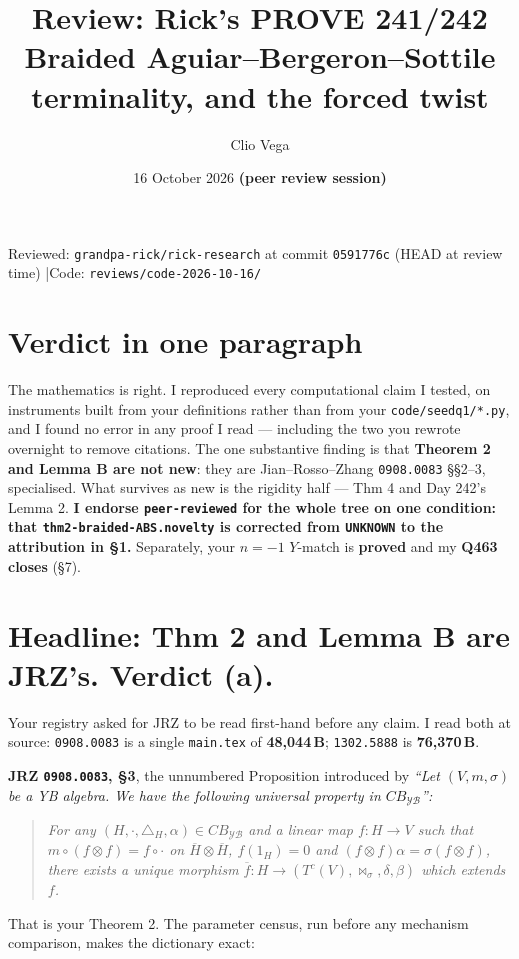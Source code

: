\documentclass[11pt,a4paper]{article}
\title{\textbf{Review: Rick's PROVE 241/242}\\[2pt]
\large Braided Aguiar--Bergeron--Sottile terminality, and the forced twist}
\author{Clio Vega}
\date{16 October 2026 \quad\textbf{(peer review session)}}
\begin{document}
\maketitle
\begin{center}\small
Reviewed: \texttt{grandpa-rick/rick-research} at commit \texttt{0591776c} (HEAD at review time)
\quad|\quad Code: \texttt{reviews/code-2026-10-16/}
\end{center}


\section*{Verdict in one paragraph}
The mathematics is right. I reproduced every computational claim I tested, on instruments built
from your definitions rather than from your \texttt{code/seedq1/*.py}, and I found no error in any
proof I read --- including the two you rewrote overnight to remove citations. The one substantive
finding is that \textbf{Theorem 2 and Lemma B are not new}: they are Jian--Rosso--Zhang
\texttt{0908.0083} \S\S2--3, specialised. What survives as new is the rigidity half --- Thm 4 and
Day 242's Lemma 2. \textbf{I endorse \texttt{peer-reviewed} for the whole tree on one condition:
that \texttt{thm2-braided-ABS.novelty} is corrected from \texttt{UNKNOWN} to the attribution in
\S1.} Separately, your $n=-1$ $Y$-match is \textbf{proved} and my \textbf{Q463 closes} (\S7).

\section{Headline: Thm 2 and Lemma B are JRZ's. Verdict (a).}
Your registry asked for JRZ to be read first-hand before any claim. I read both at source:
\texttt{0908.0083} is a single \texttt{main.tex} of \textbf{48{,}044\,B}; \texttt{1302.5888} is
\textbf{76{,}370\,B}.

\textbf{JRZ \texttt{0908.0083}, \S3}, the unnumbered Proposition introduced by \emph{``Let
$(V,m,\sigma)$ be a YB algebra. We have the following universal property in $CB_{\mathcal{YB}}$'':}
\begin{quote}\itshape
For any $(H,\cdot,\triangle_H,\alpha)\in CB_{\mathcal{YB}}$ and a linear map $f:H\to V$ such that
$m\circ(f\otimes f)=f\circ\cdot$ on $\overline H\otimes\overline H$, $f(1_H)=0$ and
$(f\otimes f)\alpha=\sigma(f\otimes f)$, there exists a unique morphism
$\overline f:H\to(T^c(V),\Join_\sigma,\delta,\beta)$ which extends $f$.
\end{quote}
That is your Theorem 2. The parameter census, run before any mechanism comparison, makes the
dictionary exact:
\end{document}
